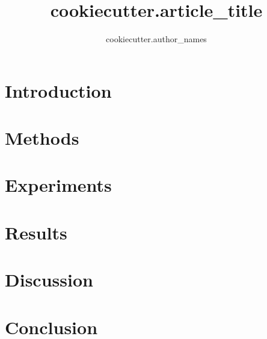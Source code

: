 \documentclass[runningheads]{llncs}
\begin{document}
\title{
    {{ cookiecutter.article_title }}
}

\author{
    {{ cookiecutter.author_names }}
}

\maketitle

\begin{abstract}

\end{abstract} 

\section{Introduction}

\section{Methods}

\section{Experiments}

\section{Results}

\section{Discussion}

\section{Conclusion}




\end{document}
